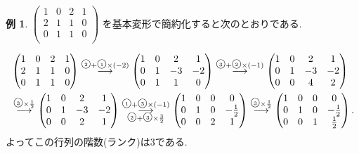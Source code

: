 \documentclass[dvipdfmx,a4paper,11pt]{article}
\newcommand{\maru}[1]{\raise0.2ex\hbox{\textcircled{\tiny{#1}}}}
\theoremstyle{definition}
\newtheorem{exa}[thm]{例}
\begin{document}
\begin{exa}
$
 \begin{pmatrix}
 1& 0& 2  &1\\
 2& 1& 1  &0\\
 0& 1& 1  &0\\
 \end{pmatrix}
 $
 を基本変形で簡約化すると次のとおりである.
 
 \begin{align*}
 &\begin{pmatrix}
 1& 0& 2  &1\\
 2& 1& 1  &0\\
 0& 1& 1  &0\\
 \end{pmatrix}
 \overset{\maru{2} + \maru{1}\times(-2)}{\longrightarrow} 
\begin{pmatrix}
 1& 0& 2  &1\\
 0& 1& -3 &-2\\
 0& 1& 1  &0\\
 \end{pmatrix}
\overset{\maru{3} + \maru{2}\times(-1)}{\longrightarrow} 
\begin{pmatrix}
 1& 0& 2  &1\\
 0& 1& -3 &-2\\
 0& 0& 4  &2\\
 \end{pmatrix}
 \\ %
 & \overset{\maru{3}\times \frac{1}{2}}{\longrightarrow} 
\begin{pmatrix}
 1& 0& 2  &1\\
 0& 1& -3 &-2\\
 0& 0& 2  &1\\
 \end{pmatrix} 
 \overset{\maru{1} + \maru{3}\times (-1)}{\underset{\maru{2} + \maru{3}\times \frac{3}{2}}{\longrightarrow}}
 \begin{pmatrix}
 1& 0& 0  &0\\
 0& 1& 0 &-\frac{1}{2}\\
 0& 0& 2  &1\\
 \end{pmatrix} 
 \overset{\maru{3}\times \frac{1}{2}}{\longrightarrow} 
  \begin{pmatrix}
 1& 0& 0  &0\\
 0& 1& 0 &-\frac{1}{2}\\
 0& 0& 1 &\frac{1}{2}\\
 \end{pmatrix}.
 \end{align*}
   よってこの行列の階数(ランク)は3である.
 \end{exa}
 
\end{document}
